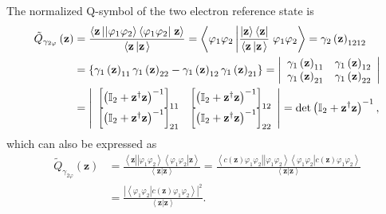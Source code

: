 \documentclass[aps,preprint]{revtex4}%
\begin{document}
The normalized Q-symbol of the two electron reference state is
\begin{align}
\tilde{Q}_{\gamma_{2\varphi}}\left(  \mathbf{z}\right)   &  =\frac
{\left\langle \mathbf{z}\left\vert \left\vert \varphi_{1}\varphi
_{2}\right\rangle \left\langle \varphi_{1}\varphi_{2}\right\vert \right.
\mathbf{z}\right\rangle }{\left\langle \mathbf{z\left\vert \mathbf{z}\right.
}\right\rangle }=\left\langle \varphi_{1}\varphi_{2}\left\vert \frac
{\left\vert \mathbf{z}\right\rangle \left\langle \mathbf{z}\right\vert
}{\left\langle \mathbf{z\left\vert \mathbf{z}\right.  }\right\rangle }\right.
\varphi_{1}\varphi_{2}\right\rangle =\gamma_{2}\left(  \mathbf{z}\right)
_{1212}\nonumber\\
&  =\left\{  \gamma_{1}\left(  \mathbf{z}\right)  _{11}\gamma_{1}\left(
\mathbf{z}\right)  _{22}-\gamma_{1}\left(  \mathbf{z}\right)  _{12}\gamma
_{1}\left(  \mathbf{z}\right)  _{21}\right\}  =\left\vert
\begin{array}
[c]{cc}%
\gamma_{1}\left(  \mathbf{z}\right)  _{11} & \gamma_{1}\left(  \mathbf{z}%
\right)  _{12}\\
\gamma_{1}\left(  \mathbf{z}\right)  _{21} & \gamma_{1}\left(  \mathbf{z}%
\right)  _{22}%
\end{array}
\right\vert \nonumber\\
&  =\left\vert
\begin{array}
[c]{cc}%
\left[  \left(  \mathbb{I}_{2}+\mathbf{z}^{\dagger}\mathbf{z}\right)
^{-1}\right]  _{11} & \left[  \left(  \mathbb{I}_{2}+\mathbf{z}^{\dagger
}\mathbf{z}\right)  ^{-1}\right]  _{12}\\
\left[  \left(  \mathbb{I}_{2}+\mathbf{z}^{\dagger}\mathbf{z}\right)
^{-1}\right]  _{21} & \left[  \left(  \mathbb{I}_{2}+\mathbf{z}^{\dagger
}\mathbf{z}\right)  ^{-1}\right]  _{22}%
\end{array}
\right\vert =\det\left(  \mathbb{I}_{2}+\mathbf{z}^{\dagger}\mathbf{z}\right)
^{-1},
\end{align}
which can also be expressed as
\begin{align}
\tilde{Q}_{\gamma_{2\varphi}}\left(  \mathbf{z}\right)   &  =\frac
{\left\langle \mathbf{z}\left\vert \left\vert \varphi_{1}\varphi
_{2}\right\rangle \left\langle \varphi_{1}\varphi_{2}\right\vert \right.
\mathbf{z}\right\rangle }{\left\langle \mathbf{z\left\vert \mathbf{z}\right.
}\right\rangle }=\frac{\left\langle c\left(  \mathbf{z}\right)  \varphi
_{1}\varphi_{2}\left\vert \left\vert \varphi_{1}\varphi_{2}\right\rangle
\left\langle \varphi_{1}\varphi_{2}\right\vert \right.  c\left(
\mathbf{z}\right)  \varphi_{1}\varphi_{2}\right\rangle }{\left\langle
\mathbf{z\left\vert \mathbf{z}\right.  }\right\rangle }\nonumber\\
&  =\frac{\left\vert \left\langle \varphi_{1}\varphi_{2}\left\vert c\left(
\mathbf{z}\right)  \varphi_{1}\varphi_{2}\right.  \right\rangle \right\vert
^{2}}{\left\langle \mathbf{z\left\vert \mathbf{z}\right.  }\right\rangle }.
\end{align}
\end{document}
